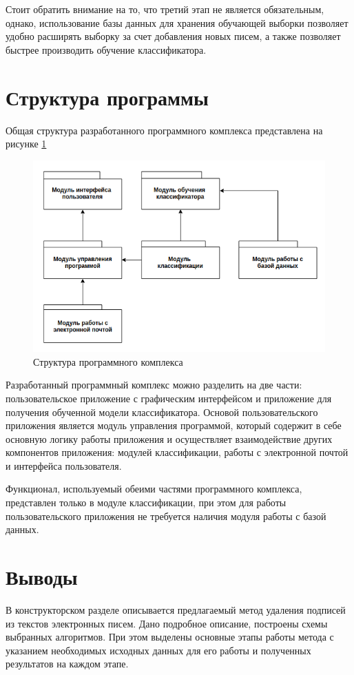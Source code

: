 Стоит обратить внимание на то, что третий этап не является обязательным, однако, использование базы данных для хранения обучающей выборки позволяет удобно расширять выборку за счет добавления новых писем, а также позволяет быстрее производить обучение классификатора.

\section{Структура программы}

Общая структура разработанного программного комплекса представлена на рисунке \ref{design:modules}

\begin{figure}[h!]
	\centering
	\includegraphics[width=\textwidth]{inc/img/modules.png}
	\caption{Структура программного комплекса}
	\label{design:modules}
\end{figure}

Разработанный программный комплекс можно разделить на две части: пользовательское приложение с графическим интерфейсом и приложение для получения обученной модели классификатора. 
Основой пользовательского приложения является модуль управления программой, который содержит в себе основную логику работы приложения и осуществляет взаимодействие других компонентов приложения: модулей классификации, работы с электронной почтой и интерфейса пользователя.

Функционал, используемый обеими частями программного комплекса, представлен только в модуле классификации, при этом для работы пользовательского приложения не требуется наличия модуля работы с базой данных.

\section{Выводы}
В конструкторском разделе описывается предлагаемый метод удаления подписей из текстов электронных писем. Дано подробное описание, построены схемы выбранных алгоритмов. При этом выделены основные этапы работы метода с указанием необходимых исходных данных для его работы и полученных результатов на каждом этапе.
